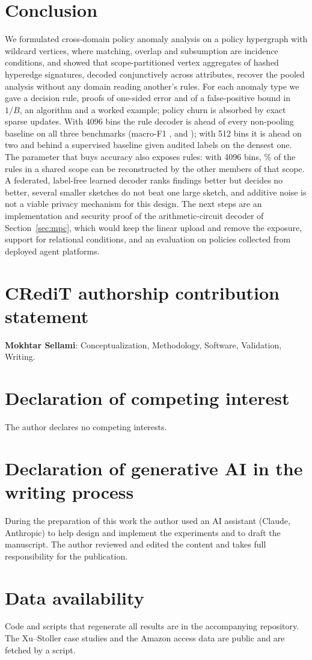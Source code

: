 \documentclass[preprint,12pt]{elsarticle}
\theoremstyle{definition}
\begin{document}
\section{Conclusion}
\label{sec:conclusion}
We formulated cross-domain policy anomaly analysis on a policy hypergraph with wildcard vertices, where matching, overlap and subsumption are incidence conditions, and showed that scope-partitioned vertex aggregates of hashed hyperedge signatures, decoded conjunctively across attributes, recover the pooled analysis without any domain reading another's rules. For each anomaly type we gave a decision rule, proofs of one-sided error and of a false-positive bound in $1/B$, an algorithm and a worked example; policy churn is absorbed by exact sparse updates. With 4096 bins the rule decoder is ahead of every non-pooling baseline on all three benchmarks (macro-F1 \mainagenticRbig, \mainxustollerRbig{} and \mainamazonRbig); with 512 bins it is ahead on two and behind a supervised baseline given audited labels on the densest one. The parameter that buys accuracy also exposes rules: with 4096 bins, \lkallBmmmmxcvi\% of the rules in a shared scope can be reconstructed by the other members of that scope. A federated, label-free learned decoder ranks findings better but decides no better, several smaller sketches do not beat one large sketch, and additive noise is not a viable privacy mechanism for this design. The next steps are an implementation and security proof of the arithmetic-circuit decoder of Section~\ref{sec:mpc}, which would keep the linear upload and remove the exposure, support for relational conditions, and an evaluation on policies collected from deployed agent platforms.

\section*{CRediT authorship contribution statement}
\textbf{Mokhtar Sellami}: Conceptualization, Methodology, Software, Validation, Writing.

\section*{Declaration of competing interest}
The author declares no competing interests.

\section*{Declaration of generative AI in the writing process}
During the preparation of this work the author used an AI assistant (Claude, Anthropic) to help design and implement the experiments and to draft the manuscript. The author reviewed and edited the content and takes full responsibility for the publication.

\section*{Data availability}
Code and scripts that regenerate all results are in the accompanying repository. The Xu--Stoller case studies and the Amazon access data are public and are fetched by a script.



\end{document}
